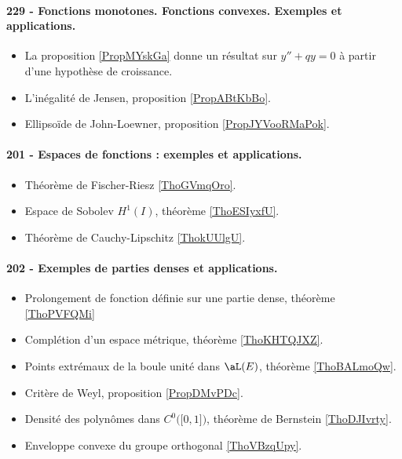\paragraph{229 - Fonctions monotones. Fonctions convexes. Exemples et applications.}
\begin{itemize}
    \item La proposition \ref{PropMYskGa} donne un résultat sur \( y''+qy=0\) à partir d'une hypothèse de croissance.
    \item L'inégalité de Jensen, proposition \ref{PropABtKbBo}.
    \item Ellipsoïde de John-Loewner, proposition \ref{PropJYVooRMaPok}.
\end{itemize}
\paragraph{201 - Espaces de fonctions : exemples et applications.}
\begin{itemize}
    \item Théorème de Fischer-Riesz \ref{ThoGVmqOro}.
    \item Espace de Sobolev \( H^1(I)\), théorème \ref{ThoESIyxfU}.
    \item Théorème de Cauchy-Lipschitz \ref{ThokUUlgU}.
\end{itemize}
\paragraph{202 - Exemples de parties denses et applications.}
\begin{itemize}
    \item Prolongement de fonction définie sur une partie dense, théorème \ref{ThoPVFQMi}
    \item Complétion d'un espace métrique, théorème \ref{ThoKHTQJXZ}.
    \item Points extrémaux de la boule unité dans \( \aL(E)\), théorème \ref{ThoBALmoQw}.
    \item Critère de Weyl, proposition \ref{PropDMvPDc}.
    \item Densité des polynômes dans \( C^0\big( \mathopen[ 0 , 1 \mathclose] \big)\), théorème de Bernstein \ref{ThoDJIvrty}.
    \item Enveloppe convexe du groupe orthogonal \ref{ThoVBzqUpy}.
\end{itemize}
